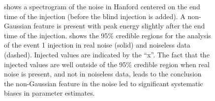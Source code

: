 \begin{figure}[t]
  \caption{\label{fig:event1bias} 
       shows a spectrogram of the noise in Hanford
      centered on the end time of the injection (before the blind injection 
      is added).  A non-Gaussian feature is present with peak energy slightly 
      after the end time of
      the injection.  shows the 95\% credible
      regions for the \eob analysis of the event 1 injection in real noise
      (solid) and noiseless data (dashed).  Injected values are indicated by
      the ``x''.  The fact that the injected values are well outside of the
      95\% credible region when real noise is present, and not in noiseless
      data, leads to the conclusion the non-Gaussian feature in the noise led
      to significant systematic biases in parameter estimates.}
\end{figure}


